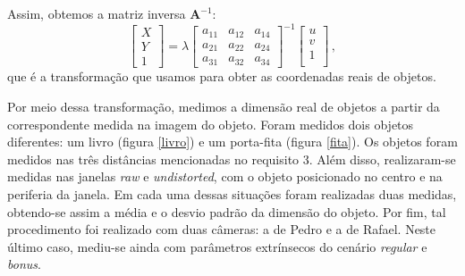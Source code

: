 \documentclass{bmvc2k}
\begin{document}
Assim, obtemos a matriz inversa $\textbf{A}^{-1}$:
\begin{equation}
    \begin{bmatrix}
    X \\
    Y \\
    1
    \end{bmatrix}
    =
    \lambda
    \begin{bmatrix}
    a_{11} & a_{12}  & a_{14}  \\
    a_{21} & a_{22}  & a_{24}  \\
    a_{31} & a_{32}  & a_{34}
    \end{bmatrix}^{-1}
    \begin{bmatrix}
    u \\
    v \\
    1 \\
    \end{bmatrix}\,,
\end{equation}
que é a transformação que usamos para obter as coordenadas reais de objetos.

Por meio dessa transformação, medimos a dimensão real de objetos a partir da correspondente medida na imagem do objeto. Foram medidos dois objetos diferentes: um livro (figura \ref{livro}) e um porta-fita (figura \ref{fita}). Os objetos foram medidos nas três distâncias mencionadas no requisito 3. Além disso, realizaram-se medidas nas janelas \textit{raw} e \textit{undistorted}, com o objeto posicionado no centro e na periferia da janela. Em cada uma dessas situações foram realizadas duas medidas, obtendo-se assim a média e o desvio padrão da dimensão do objeto. Por fim, tal procedimento foi realizado com duas câmeras: a de Pedro e a de Rafael. Neste último caso, mediu-se ainda com parâmetros extrínsecos do cenário \textit{regular} e \textit{bonus}.
\end{document}
